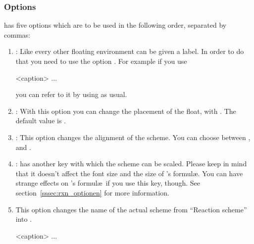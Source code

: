 \documentclass[toc=index,DIV10]{cnpkgdoc}
\begin{document}
\subsubsection{Options}\label{sssec:rxnscheme_optionen}
 has five options which are to be used in the following order,
separated by commas:
\begin{enumerate}
 \item{}: Like every other floating environment  can
   be given a label. In order to do that you need to use the option .
   For example if you use
\begin{beispiel}
 \begin{rxnscheme}[rs:schema]{<caption>}
  ...
 \end{rxnscheme}
\end{beispiel}
   you can refer to it by using  as usual.
 \item{}: With this option you can change the placement of the
   float, \eg with . The default value is .
 \item{}: This option changes the alignment of the scheme. You
   can choose between ,  and .
 \item{}:  has another key with which the
   scheme can be scaled. Please keep in mind that it doesn't affect the font size
   and the size of 's formul\ae. You can have strange effects on
   's formul\ae\ if you use this key, though. See
   section~\ref{sssec:rxn_optionen} for more information.
 \item{} This option changes the name of the actual scheme from
   ``Reaction scheme'' into .
\begin{beispiel}
 \begin{rxnscheme}[,<placement>]{<caption>}
  ...
 \end{rxnscheme}
\end{beispiel}
\end{enumerate}
\end{document}
